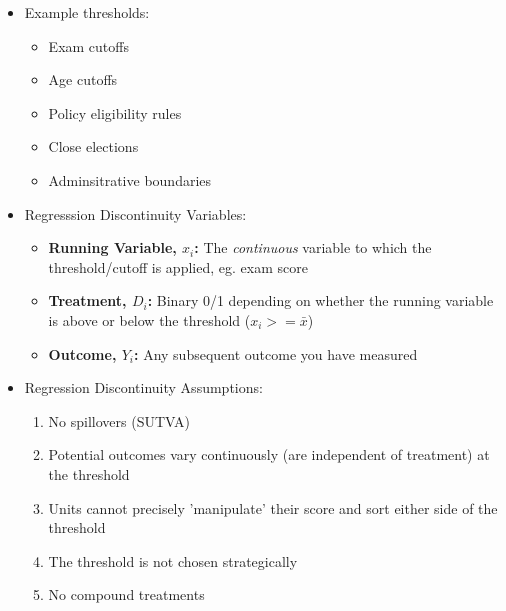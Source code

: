 \documentclass[xcolor=x11names,compress]{beamer}\usepackage[]{graphicx}\usepackage[]{color}
\renewcommand{\(}{\begin{columns}}
\renewcommand{\)}{\end{columns}}
\newcommand{\<}[1]{\begin{column}{#1}}
\renewcommand{\>}{\end{column}}
\begin{document}
\begin{frame}
\begin{itemize}
\item Example thresholds:
\begin{itemize}
\item Exam cutoffs
\item Age cutoffs
\item Policy eligibility rules
\item Close elections
\item Adminsitrative boundaries
\end{itemize}
\end{itemize}
\end{frame}

\begin{frame}
\begin{itemize}
\item Regresssion Discontinuity Variables:
\begin{itemize}
\item \textbf{Running Variable, $x_i$:} The \textit{continuous} variable to which the threshold/cutoff is applied, eg. exam score
\pause
\item \textbf{Treatment, $D_i$:} Binary 0/1 depending on whether the running variable is above or below the threshold ($x_i>=\bar{x}$)
\pause
\item \textbf{Outcome, $Y_i$:} Any subsequent outcome you have measured
\end{itemize}
\end{itemize}
\end{frame}

\begin{frame}
\begin{itemize}
\item Regression Discontinuity Assumptions:
\begin{enumerate}
\item No spillovers (SUTVA)
\pause
\item Potential outcomes vary continuously (are independent of treatment) at the threshold
\pause
\item Units cannot precisely 'manipulate' their score and sort either side of the threshold
\pause
\item The threshold is not chosen strategically
\pause
\item No compound treatments
\end{enumerate}
\end{itemize}
\end{frame}
\end{document}
